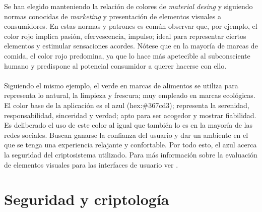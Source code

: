 \documentclass[../PFC.tex]{subfiles}
\begin{document}
Se han elegido manteniendo la relación de colores de \textit{material desing} y siguiendo normas conocidas de \textit{marketing} y presentación de elementos visuales a consumidores. En estas normas y patrones es común observar que, por ejemplo, el color rojo implica pasión, efervescencia, impulso; ideal para representar ciertos elementos y estimular sensaciones acordes. Nótese que en la mayoría de marcas de comida, el color rojo predomina, ya que lo hace más apetecible al subconsciente humano y predispone al potencial consumidor a querer hacerse con ello. 
\\\\
Siguiendo el mismo ejemplo, el verde en marcas de alimentos se utiliza para representa lo natural, la limpieza y frescura; muy empleado en marcas ecológicas. El color base de la aplicación es el azul (hex:\#367cd3); representa la serenidad, responsabilidad, sinceridad y verdad; apto para ser acogedor y mostrar fiabilidad. Es deliberado el uso de este color al igual que también lo es en la mayoría de las redes sociales. Buscan ganarse la confianza del usuario y dar un ambiente en el que se tenga una experiencia relajante y confortable. Por todo esto, el azul acerca la seguridad del criptosistema utilizado. Para más información sobre la evaluación de elementos visuales para las interfaces de usuario ver \cite{coloresStone}.

\section{Seguridad y criptología}
\label{App:Seguridad y criptología}
\end{document}
